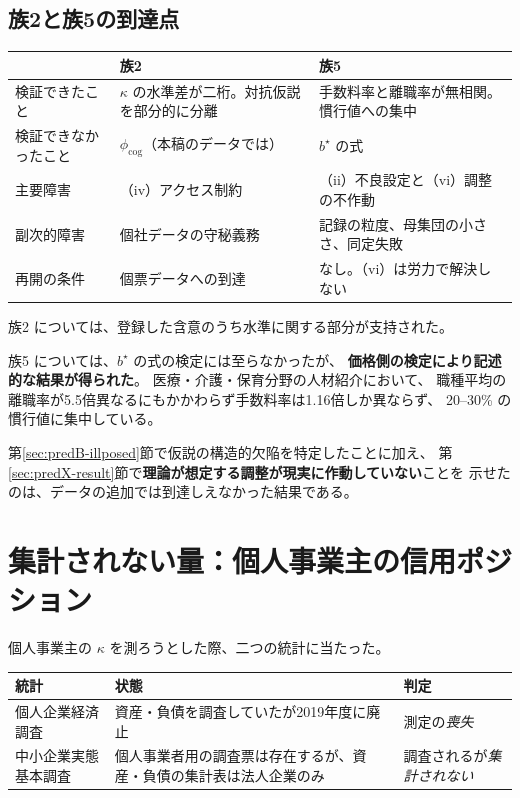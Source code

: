 \subsection{族2と族5の到達点}

\begin{center}
\begin{tabularx}{\textwidth}{@{}lXX@{}}
\toprule
 & 族2 & 族5 \\
\midrule
検証できたこと & $\kappa$ の水準差が二桁。対抗仮説を部分的に分離
 & 手数料率と離職率が無相関。慣行値への集中 \\
検証できなかったこと & $\phi_{\mathrm{cog}}$（本稿のデータでは） & $b^\star$ の式 \\
主要障害 & （iv）アクセス制約 & （ii）不良設定と（vi）調整の不作動 \\
副次的障害 & 個社データの守秘義務 & 記録の粒度、母集団の小ささ、同定失敗 \\
再開の条件 & 個票データへの到達 & なし。（vi）は労力で解決しない \\
\bottomrule
\end{tabularx}
\label{tab:family2-5-summary}
\end{center}

族2 については、登録した含意のうち水準に関する部分が支持された。

族5 については、$b^\star$ の式の検定には至らなかったが、
\textbf{価格側の検定により記述的な結果が得られた}。
医療・介護・保育分野の人材紹介において、
職種平均の離職率が5.5倍異なるにもかかわらず手数料率は1.16倍しか異ならず、
20--30\% の慣行値に集中している。

第\ref{sec:predB-illposed}節で仮説の構造的欠陥を特定したことに加え、
第\ref{sec:predX-result}節で\textbf{理論が想定する調整が現実に作動していない}ことを
示せたのは、データの追加では到達しえなかった結果である。


\section{集計されない量：個人事業主の信用ポジション}
\label{sec:not-tabulated}

個人事業主の $\kappa$ を測ろうとした際、二つの統計に当たった。

\begin{center}
\begin{tabularx}{\textwidth}{@{}lXl@{}}
\toprule
統計 & 状態 & 判定 \\
\midrule
個人企業経済調査 & 資産・負債を調査していたが2019年度に廃止 & 測定の\emph{喪失} \\
中小企業実態基本調査 & 個人事業者用の調査票は存在するが、資産・負債の集計表は法人企業のみ & 調査されるが\emph{集計されない} \\
\bottomrule
\end{tabularx}
\label{tab:individual-kappa-stats}
\end{center}

